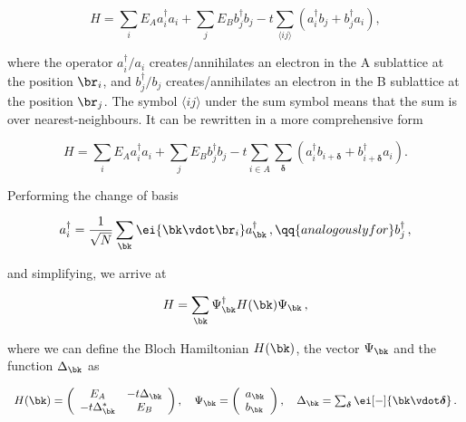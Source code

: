 \begin{equation}
    H = \sum_i E_A a_i^{\dagger} a_i + \sum_j E_B b_j^{\dagger} b_j - t \sum_{\langle i j\rangle}  \left(a_i^{\dagger} b_j+b_j^{\dagger} a_i\right) ,
    \label{eq:graphene_tight_binding_Hamiltonian}
\end{equation}

\noindent where the operator $a_i^{\dagger}/a_i$ creates/annihilates an electron in the A sublattice at the position $\br_i$, and $b_j^{\dagger}/b_j$ creates/annihilates an electron in the B sublattice at the position $\br_j$.
The symbol $\langle i j \rangle$ under the sum symbol means that the sum is over nearest-neighbours.
It can be rewritten in a more comprehensive form

\begin{equation}
    H = \sum_i E_A a_i^{\dagger} a_i + \sum_j E_B b_j^{\dagger} b_j - t \sum_{i \in A} \sum_{\boldsymbol{\delta}}\left(a_i^{\dagger} b_{i+\boldsymbol{\delta}}+b_{i+\boldsymbol{\delta}}^{\dagger} a_i\right).
    \label{eq:graphene_tight_binding_Hamiltonian_comprehensive}
\end{equation}

\noindent Performing the change of basis

\begin{equation}
    a_i^{\dagger} = \frac{1}{\sqrt{N}} \sum_{\bk} \ei{\bk \vdot \br_i} a_{\bk}^{\dagger}\,, \qq{analogously for} b_j^{\dagger}\,,
    \label{eq:second_quantization_change_of_basis}
\end{equation}

\noindent and simplifying, we arrive at

\begin{equation}
    H = \sum_{\bk} \Psi_{\bk}^{\dagger} H(\bk) \Psi_{\bk}\,,
\end{equation}

\noindent where we can define the Bloch Hamiltonian $H(\bk)$, the vector $\Psi_{\bk}$ and the function $\Delta_{\bk}$ as

\begin{equation}
    \begin{array}{l}
        H(\bk)=\left(\begin{array}{cc}
                           E_A & -t \Delta_{\bk} \\
                           -t \Delta_{\bk}^* & E_B
        \end{array}\right), \quad \Psi_{\bk}=\left(\begin{array}{l}
                                                 a_{\bk} \\
                                                 b_{\bk}
        \end{array}\right), \quad \Delta_{\bk} = \sum_{\boldsymbol{\delta}} \ei[-]{\bk \vdot \boldsymbol{\delta}}\,.
    \end{array}
\end{equation}

